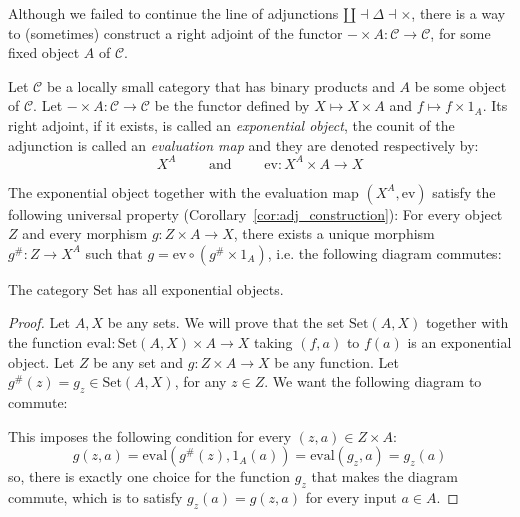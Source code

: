 Although we failed to continue the line of adjunctions $\amalg\dashv\Delta\dashv\times$, there is a way to (sometimes) construct a right adjoint of the functor $-\times A:\mathcal{C}\to\mathcal{C}$, for some fixed object $A$ of $\mathcal{C}$.
\begin{definition} Let $\mathcal{C}$ be a locally small category that has binary products and $A$ be some object of $\mathcal{C}$. Let $-\times A:\mathcal{C}\to\mathcal{C}$ be the functor defined by
$X\mapsto X\times A$ and $f\mapsto f\times1_A$. Its right adjoint, if it exists, is called an \emph{exponential object}, the counit of the adjunction is called an \emph{evaluation map} and they are denoted respectively by:
\[X^A\qquad\text{ and }\qquad\mathrm{ev}:X^A\times A\to X\]
\end{definition}
\begin{remark} The exponential object together with the evaluation map $(X^A,\mathrm{ev})$ satisfy the following universal property (Corollary~\ref{cor:adj_construction}): For every object $Z$ and every morphism $g:Z\times A\to X$, there exists a unique morphism $g^{\#}:Z\to X^A$ such that $g=\mathrm{ev}\circ(g^{\#}\times1_A)$, i.e. the following diagram commutes:
\begin{center}
\end{center}
\end{remark}
\begin{proposition} The category $\mathrm{Set}$ has all exponential objects.
\end{proposition}
\begin{proof} Let $A,X$ be any sets. We will prove that the set $\mathrm{Set}(A,X)$ together with the function $\mathrm{eval}:\mathrm{Set}(A,X)\times A\to X$ taking $(f,a)$ to $f(a)$ is an exponential object. Let $Z$ be any set and $g:Z\times A\to X$ be any function. Let $g^{\#}(z)=g_z\in\mathrm{Set}(A,X)$, for any $z\in Z$. We want the following diagram to commute:
\begin{center}
\end{center}
This imposes the following condition for every $(z,a)\in Z\times A$:
\[g(z,a)=\mathrm{eval}(g^{\#}(z),1_A(a))=\mathrm{eval}(g_z,a)=g_z(a)\]
so, there is exactly one choice for the function $g_z$ that makes the diagram commute, which is to satisfy $g_z(a)=g(z,a)$ for every input $a\in A$.
\end{proof}
